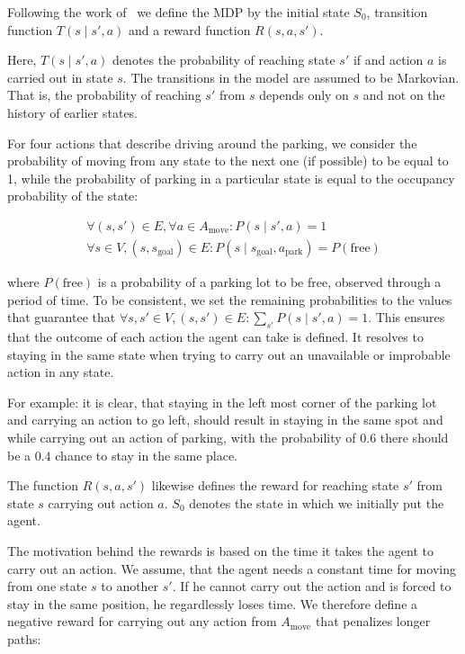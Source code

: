 Following the work of~\citet{bellman1957} we define the MDP by the initial
state $S_0$, transition function $T(s \mid s', a)$ and a reward function $R(s,
a, s')$.

Here, $T(s \mid s', a)$ denotes the probability of reaching state
$s'$ if and action $a$ is carried out in state $s$. The transitions in the
model are assumed to be Markovian. That is, the probability of reaching $s'$
from $s$ depends only on $s$ and not on the history of earlier states.

For four actions that describe driving around the parking, we consider the
probability of moving from any state to the next one (if possible) to be equal
to 1, while the probability of parking in a particular state is equal to the
occupancy probability of the state:

\begin{eqnarray}
\forall (s, s') \in E, \forall a \in A_{\mbox{move}} : P(s \mid s', a) = 1 \\
\forall s \in V, (s,s_{\mbox{goal}}) \in E : P(s \mid s_{\mbox{goal}}, a_{\mbox{park}}) = P(\mbox{free})
\end{eqnarray}

where $P(\mbox{free})$ is a probability of a parking lot to be free, observed
through a period of time. To be consistent, we set the remaining probabilities
to the values that guarantee that $\forall s, s' \in V, (s, s') \in E :
\sum_{s'}P(s \mid s', a) = 1$. This ensures that the outcome of each action
the agent can take is defined. It resolves to staying in the same state when
trying to carry out an unavailable or improbable action in any state.

For example: it is clear, that staying in the left most corner of the parking
lot and carrying an action to go left, should result in staying in the same
spot and while carrying out an action of parking, with the probability of
$0.6$ there should be a $0.4$ chance to stay in the same place.

The function $R(s, a, s')$ likewise defines the reward for reaching state $s'$
from state $s$ carrying out action $a$. $S_0$ denotes the state in which we
initially put the agent.

The motivation behind the rewards is based on the time it takes the agent to
carry out an action. We assume, that the agent needs a constant time for
moving from one state $s$ to another $s'$. If he cannot carry out the action
and is forced to stay in the same position, he regardlessly loses time. We
therefore define a negative reward for carrying out any action from
$A_{\mbox{move}}$ that penalizes longer paths:

